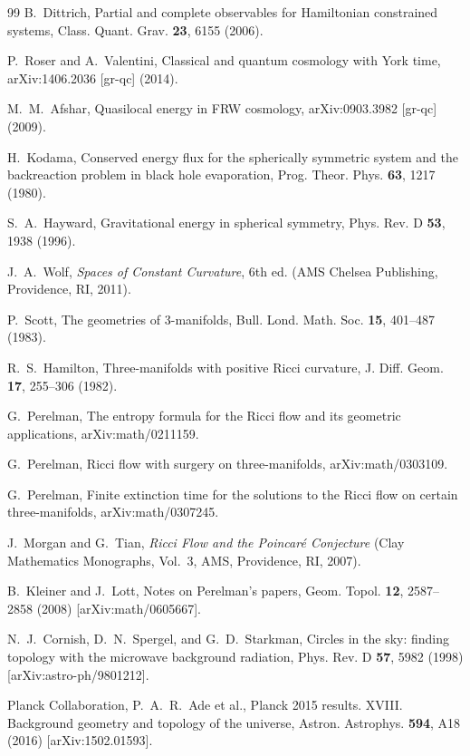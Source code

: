 \documentclass[12pt,a4paper]{article}
\begin{document}
\begin{thebibliography}{99}
B.~Dittrich,
Partial and complete observables for Hamiltonian constrained systems,
Class. Quant. Grav. \textbf{23}, 6155 (2006).

P.~Roser and A.~Valentini,
Classical and quantum cosmology with York time,
arXiv:1406.2036 [gr-qc] (2014).

M.~M.~Afshar,
Quasilocal energy in FRW cosmology,
arXiv:0903.3982 [gr-qc] (2009).

H.~Kodama,
Conserved energy flux for the spherically symmetric system and the backreaction problem in black hole evaporation,
Prog. Theor. Phys. \textbf{63}, 1217 (1980).

S.~A.~Hayward,
Gravitational energy in spherical symmetry,
Phys. Rev. D \textbf{53}, 1938 (1996).

J.~A.~Wolf,
\emph{Spaces of Constant Curvature}, 6th ed.
(AMS Chelsea Publishing, Providence, RI, 2011).

P.~Scott,
The geometries of 3-manifolds,
Bull. Lond. Math. Soc. \textbf{15}, 401--487 (1983).

R.~S.~Hamilton,
Three-manifolds with positive Ricci curvature,
J. Diff. Geom. \textbf{17}, 255--306 (1982).

G.~Perelman,
The entropy formula for the Ricci flow and its geometric applications,
arXiv:math/0211159.

G.~Perelman,
Ricci flow with surgery on three-manifolds,
arXiv:math/0303109.

G.~Perelman,
Finite extinction time for the solutions to the Ricci flow on certain three-manifolds,
arXiv:math/0307245.

J.~Morgan and G.~Tian,
\emph{Ricci Flow and the Poincar\'e Conjecture}
(Clay Mathematics Monographs, Vol.~3, AMS, Providence, RI, 2007).

B.~Kleiner and J.~Lott,
Notes on Perelman's papers,
Geom. Topol. \textbf{12}, 2587--2858 (2008) [arXiv:math/0605667].

N.~J.~Cornish, D.~N.~Spergel, and G.~D.~Starkman,
Circles in the sky: finding topology with the microwave background radiation,
Phys. Rev. D \textbf{57}, 5982 (1998) [arXiv:astro-ph/9801212].

Planck Collaboration, P.~A.~R.~Ade et al.,
Planck 2015 results. XVIII. Background geometry and topology of the universe,
Astron. Astrophys. \textbf{594}, A18 (2016) [arXiv:1502.01593].


\end{thebibliography}
\end{document}
